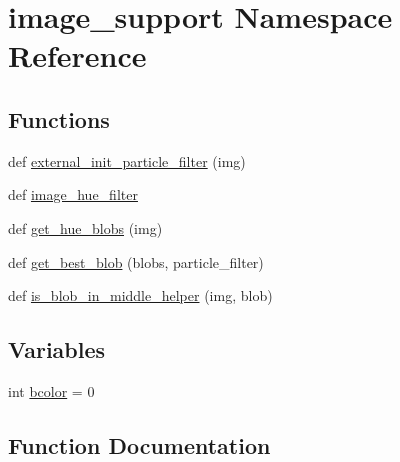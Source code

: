 \hypertarget{namespaceimage__support}{}\section{image\+\_\+support Namespace Reference}
\label{namespaceimage__support}
\subsection*{Functions}
\begin{DoxyCompactItemize}
\item 
def \hyperlink{namespaceimage__support_a45e637a8685d23a453229102a4346327}{external\+\_\+init\+\_\+particle\+\_\+filter} (img)
\item 
def \hyperlink{namespaceimage__support_aff0422e55f0d6119a012115570442c3f}{image\+\_\+hue\+\_\+filter}
\item 
def \hyperlink{namespaceimage__support_aaa6d938c26b4ad5878e1bfb6870e749b}{get\+\_\+hue\+\_\+blobs} (img)
\item 
def \hyperlink{namespaceimage__support_a0cebf9b300caec4b9e3f7725204f7f63}{get\+\_\+best\+\_\+blob} (blobs, particle\+\_\+filter)
\item 
def \hyperlink{namespaceimage__support_ae76ebc019a04c735f46210bc29e55f76}{is\+\_\+blob\+\_\+in\+\_\+middle\+\_\+helper} (img, blob)
\end{DoxyCompactItemize}
\subsection*{Variables}
\begin{DoxyCompactItemize}
\item 
int \hyperlink{namespaceimage__support_a1cfece0a81077dca0136b23884fb318d}{bcolor} = 0
\end{DoxyCompactItemize}


\subsection{Function Documentation}
\hypertarget{namespaceimage__support_a45e637a8685d23a453229102a4346327}{}
